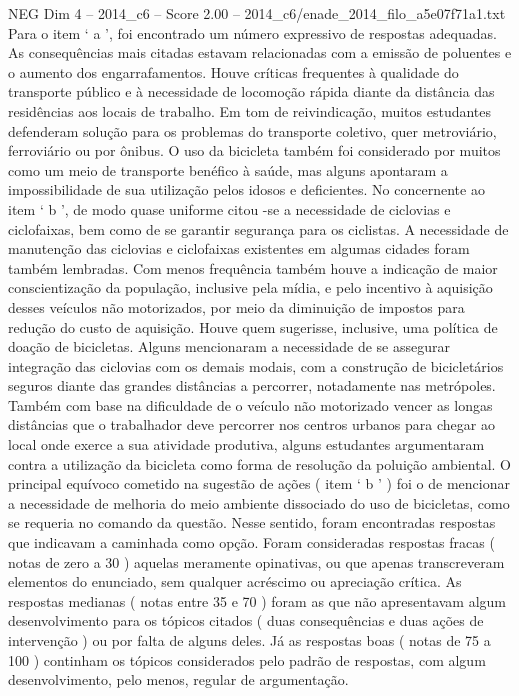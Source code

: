 \begin{textsample}{NEG Dim 4 – 2014\_c6 – Score 2.00 – 2014\_c6/enade\_2014\_filo\_a5e07f71a1.txt}
Para o item ‘ a ’, foi encontrado um número expressivo de respostas adequadas.
As consequências mais citadas estavam relacionadas com a emissão de poluentes e o aumento dos engarrafamentos.
Houve críticas frequentes à qualidade do transporte público e à necessidade de locomoção rápida diante da distância das residências aos locais de trabalho.
Em tom de reivindicação, muitos estudantes defenderam solução para os problemas do transporte coletivo, quer metroviário, ferroviário ou por ônibus.
O uso da bicicleta também foi considerado por muitos como um meio de transporte benéfico à saúde, mas alguns apontaram a impossibilidade de sua utilização pelos idosos e deficientes.
No concernente ao item ‘ b ’, de modo quase uniforme citou -se a necessidade de ciclovias e ciclofaixas, bem como de se garantir segurança para os ciclistas.
A necessidade de manutenção das ciclovias e ciclofaixas existentes em algumas cidades foram também lembradas.
Com menos frequência também houve a indicação de maior conscientização da população, inclusive pela mídia, e pelo incentivo à aquisição desses veículos não motorizados, por meio da diminuição de impostos para redução do custo de aquisição.
Houve quem sugerisse, inclusive, uma política de doação de bicicletas.
Alguns mencionaram a necessidade de se assegurar integração das ciclovias com os demais modais, com a construção de bicicletários seguros diante das grandes distâncias a percorrer, notadamente nas metrópoles.
Também com base na dificuldade de o veículo não motorizado vencer as longas distâncias que o trabalhador deve percorrer nos centros urbanos para chegar ao local onde exerce a sua atividade produtiva, alguns estudantes argumentaram contra a utilização da bicicleta como forma de resolução da poluição ambiental.
O principal equívoco cometido na sugestão de ações ( item ‘ b ’ ) foi o de mencionar a necessidade de melhoria do meio ambiente dissociado do uso de bicicletas, como se requeria no comando da questão.
Nesse sentido, foram encontradas respostas que indicavam a caminhada como opção.
Foram consideradas respostas fracas ( notas de zero a 30 ) aquelas meramente opinativas, ou que apenas transcreveram elementos do enunciado, sem qualquer acréscimo ou apreciação crítica.
As respostas medianas ( notas entre 35 e 70 ) foram as que não apresentavam algum desenvolvimento para os tópicos citados ( duas consequências e duas ações de intervenção ) ou por falta de alguns deles.
Já as respostas boas ( notas de 75 a 100 ) continham os tópicos considerados pelo padrão de respostas, com algum desenvolvimento, pelo menos, regular de argumentação.

\end{textsample}
